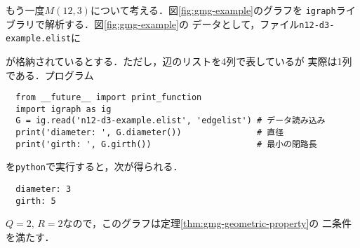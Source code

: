 \begin{example}
  もう一度$M(12,3)$について考える．図\ref{fig:gmg-example}のグラフを
  \verb|igraph|ライブラリで解析する．図\ref{fig:gmg-example}の
  データとして，ファイル\verb|n12-d3-example.elist|に
\begin{multicols}{4}
  
\end{multicols}
が格納されているとする．ただし，辺のリストを4列で表しているが
実際は1列である．プログラム
\begin{verbatim}
  from __future__ import print_function
  import igraph as ig
  G = ig.read('n12-d3-example.elist', 'edgelist') # データ読み込み
  print('diameter: ', G.diameter())               # 直径
  print('girth: ', G.girth())                     # 最小の閉路長
\end{verbatim}
を\verb|python|で実行すると，次が得られる．
\begin{verbatim}
  diameter: 3
  girth: 5
\end{verbatim}
  $Q=2,\,R=2$なので，このグラフは定理\ref{thm:gmg-geometric-property}の
  二条件を満たす．
\end{example}

